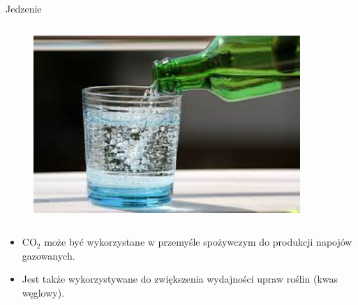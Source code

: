 \begin{columnframe}{Jedzenie}
    \begin{column}{0.5\textwidth}
        \begin{figure}
            \centering
            \includegraphics[width=0.9\textwidth, frame]{images/carbonated_water_stock_image.jpg}
        \end{figure}
    \end{column}
    \begin{column}{0.5\textwidth}
        \begin{itemize}
            \item CO$_2$ może być wykorzystane w przemyśle spożywczym do produkcji napojów gazowanych.
            \item Jest także wykorzystywane do zwiększenia wydajności upraw roślin (kwas węglowy).
        \end{itemize}
    \end{column}
\end{columnframe}

